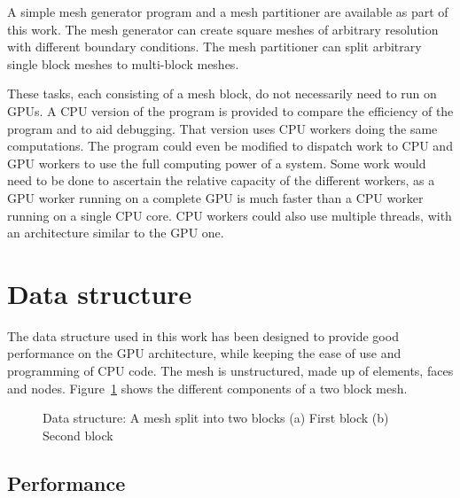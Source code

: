A simple mesh generator program and a mesh partitioner are available as part of this work. The mesh
generator can create square meshes of arbitrary resolution with different boundary conditions. The
mesh partitioner can split arbitrary single block meshes to multi-block meshes.

These tasks, each consisting of a mesh block, do not necessarily need to run on GPUs. A CPU version
of the program is provided to compare the efficiency of the program and to aid debugging. That
version uses CPU workers doing the same computations. The program could even be modified to dispatch
work to CPU and GPU workers to use the full computing power of a system. Some work would need to be
done to ascertain the relative capacity of the different workers, as a GPU worker running on a
complete GPU is much faster than a CPU worker running on a single CPU core. CPU workers could also
use multiple threads, with an architecture similar to the GPU one.

\section{Data structure} \label{section:graphics_processing_units:data_structure}

The data structure used in this work has been designed to provide good performance on the GPU
architecture, while keeping the ease of use and programming of CPU code. The mesh is unstructured,
made up of elements, faces and nodes. Figure~\ref{fig:mesh_structure} shows the different
components of a two block mesh.

\begin{figure}[H]
	\centering
	\hfill
	\caption{Data structure: A mesh split into two blocks (a) First block (b) Second block}
	\label{fig:mesh_structure}
\end{figure}

\subsection{Performance} \label{subsection:graphics_processing_units:data_structure:performance}

